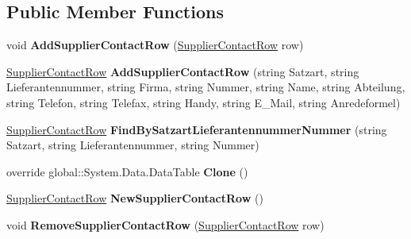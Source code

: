 \subsection*{Public Member Functions}
\begin{DoxyCompactItemize}
\item 
void {\bfseries Add\+Supplier\+Contact\+Row} (\hyperlink{class_products_1_1_data_1_1ds_sage_1_1_supplier_contact_row}{Supplier\+Contact\+Row} row)\hypertarget{class_products_1_1_data_1_1ds_sage_1_1_supplier_contact_data_table_a6d50e3fe6257750f30bd3fe757eaf473}{}\label{class_products_1_1_data_1_1ds_sage_1_1_supplier_contact_data_table_a6d50e3fe6257750f30bd3fe757eaf473}

\item 
\hyperlink{class_products_1_1_data_1_1ds_sage_1_1_supplier_contact_row}{Supplier\+Contact\+Row} {\bfseries Add\+Supplier\+Contact\+Row} (string Satzart, string Lieferantennummer, string Firma, string Nummer, string Name, string Abteilung, string Telefon, string Telefax, string Handy, string E\+\_\+\+Mail, string Anredeformel)\hypertarget{class_products_1_1_data_1_1ds_sage_1_1_supplier_contact_data_table_ac847d5701669937c7d6b7d826f5d4da9}{}\label{class_products_1_1_data_1_1ds_sage_1_1_supplier_contact_data_table_ac847d5701669937c7d6b7d826f5d4da9}

\item 
\hyperlink{class_products_1_1_data_1_1ds_sage_1_1_supplier_contact_row}{Supplier\+Contact\+Row} {\bfseries Find\+By\+Satzart\+Lieferantennummer\+Nummer} (string Satzart, string Lieferantennummer, string Nummer)\hypertarget{class_products_1_1_data_1_1ds_sage_1_1_supplier_contact_data_table_a31ee35864a689d8c47ec44bf2ad297be}{}\label{class_products_1_1_data_1_1ds_sage_1_1_supplier_contact_data_table_a31ee35864a689d8c47ec44bf2ad297be}

\item 
override global\+::\+System.\+Data.\+Data\+Table {\bfseries Clone} ()\hypertarget{class_products_1_1_data_1_1ds_sage_1_1_supplier_contact_data_table_acab41b7f0c0e96fc04d97aca9f6d55e5}{}\label{class_products_1_1_data_1_1ds_sage_1_1_supplier_contact_data_table_acab41b7f0c0e96fc04d97aca9f6d55e5}

\item 
\hyperlink{class_products_1_1_data_1_1ds_sage_1_1_supplier_contact_row}{Supplier\+Contact\+Row} {\bfseries New\+Supplier\+Contact\+Row} ()\hypertarget{class_products_1_1_data_1_1ds_sage_1_1_supplier_contact_data_table_a534e7bf58e6555c1e973caa10a70452d}{}\label{class_products_1_1_data_1_1ds_sage_1_1_supplier_contact_data_table_a534e7bf58e6555c1e973caa10a70452d}

\item 
void {\bfseries Remove\+Supplier\+Contact\+Row} (\hyperlink{class_products_1_1_data_1_1ds_sage_1_1_supplier_contact_row}{Supplier\+Contact\+Row} row)\hypertarget{class_products_1_1_data_1_1ds_sage_1_1_supplier_contact_data_table_a489d34b6c3b716ce1e6bcb2020125c7c}{}\label{class_products_1_1_data_1_1ds_sage_1_1_supplier_contact_data_table_a489d34b6c3b716ce1e6bcb2020125c7c}

\end{DoxyCompactItemize}
